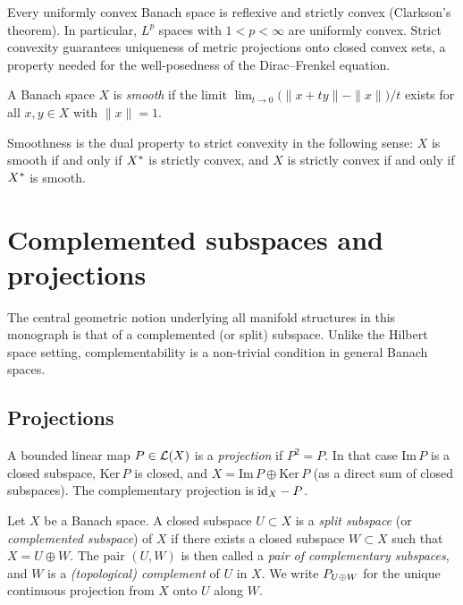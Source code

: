 Every uniformly convex Banach space is reflexive and strictly convex
(Clarkson's theorem). In particular, $L^p$ spaces with $1 < p < \infty$
are uniformly convex. Strict convexity guarantees uniqueness of metric
projections onto closed convex sets, a property needed for the
well-posedness of the Dirac--Frenkel equation.

\begin{definition}
\label{def:smooth}
A Banach space $X$ is \emph{smooth} if the limit
$\lim_{t \to 0} \bigl(\|x + ty\| - \|x\|\bigr)/t$
exists for all $x, y \in X$ with $\|x\| = 1$.
\end{definition}

Smoothness is the dual property to strict convexity in the following
sense: $X$ is smooth if and only if $X^*$ is strictly convex, and
$X$ is strictly convex if and only if $X^*$ is smooth.

\section{Complemented subspaces and projections}
\label{sec:banach:complemented}

The central geometric notion underlying all manifold structures in this
monograph is that of a complemented (or split) subspace. Unlike the
Hilbert space setting, complementability is a non-trivial condition in
general Banach spaces.

\subsection*{Projections}

A bounded linear map $P \in \mathcal{L}(X)$ is a \emph{projection} if $P^2 = P$.
In that case $\mathrm{Im}\,P$ is a closed subspace, $\mathrm{Ker}\,P$ is
closed, and $X = \mathrm{Im}\,P \oplus \mathrm{Ker}\,P$ (as a direct sum
of closed subspaces). The complementary projection is $\mathrm{id}_{X} - P$.

\begin{definition}
\label{def:split_subspace}
Let $X$ be a Banach space. A closed subspace $U \subset X$ is a
\emph{split subspace} (or \emph{complemented subspace}) of $X$ if
there exists a closed subspace $W \subset X$ such that
$X = U \oplus W$.
The pair $(U, W)$ is then called a \emph{pair of complementary
subspaces}, and $W$ is a \emph{(topological) complement} of $U$ in $X$.
We write $P_{U \oplus W}$ for the unique continuous projection from $X$
onto $U$ along $W$.
\end{definition}

